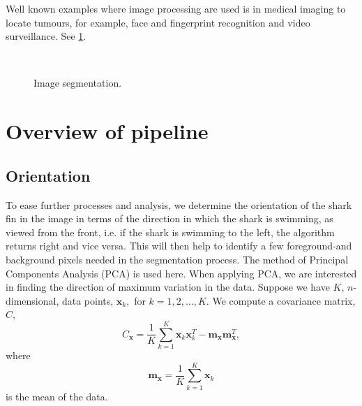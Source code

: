 \documentclass[a4paper,10pt]{article}
\begin{document}
Well known examples where image processing are used is
in medical imaging to locate tumours, for example, face and
fingerprint recognition and video surveillance.  See \ref{examples}.

\begin{figure}[H]
\centering
\mbox{ \quad
{}}
\caption{Image segmentation.}
\label{examples}
\end{figure}

\newpage
\section{Overview of pipeline}


\subsection{Orientation}
To ease further processes and analysis, we determine the orientation of the shark fin in the image in terms of the direction in which the shark is swimming, as viewed from the front, 
i.e. if the shark is swimming to the left, the algorithm returns right and vice versa. This will then help to identify a few foreground-and background
pixels needed in the segmentation process.  
The method of Principal Components Analysis (PCA) is used here.  When applying PCA, we are interested in finding the direction of maximum variation in 
the data.  Suppose we have $K$, $n$-dimensional, data points, $\mathbf{x}_k,$ for $k=1,2, \ldots ,K$. We compute a covariance matrix, $C$,
\[
 C_{\mathbf{x}} = \frac{1}{K} \sum_{k=1}^{K} \mathbf{x}_{k}\mathbf{x}_{k}^{T} - \mathbf{m}_{\mathbf{x}}\mathbf{m}_{\mathbf{x}}^{T} 
,\]
where
\[
 \mathbf{m}_{\mathbf{x}} = \frac{1}{K} \sum_{k=1}^{K}\mathbf{x}_{k}
\]
is the mean of the data.  \\
\end{document}

